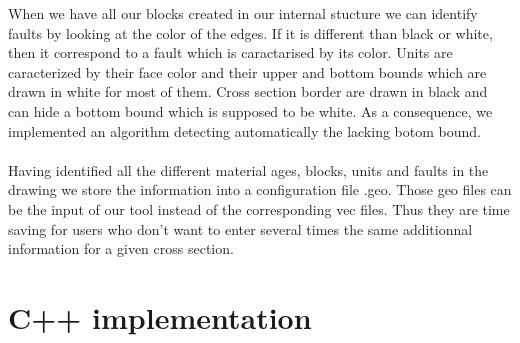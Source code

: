 \documentclass[12pt, a4paper]{report} %
\begin{document}
When we have all our blocks created in our internal stucture we can identify faults by looking at the color of the edges. If it is different than black or white, then it correspond to a fault which is caractarised by its color. Units are caracterized by their face color and their upper and bottom bounds which are drawn in white for most of them. Cross section border are drawn in black and can hide a bottom bound which is supposed to be white. As a consequence, we implemented an algorithm  detecting automatically the lacking botom bound.\\\\
Having identified all the different material ages, blocks, units and faults in the drawing we store the information into a configuration file .geo. Those geo files can be the input of our tool instead of the corresponding vec files. Thus they  are time saving for users who don't want to enter several times the same additionnal information for a given cross section.

\section{C++ implementation}  
  
\end{document}
